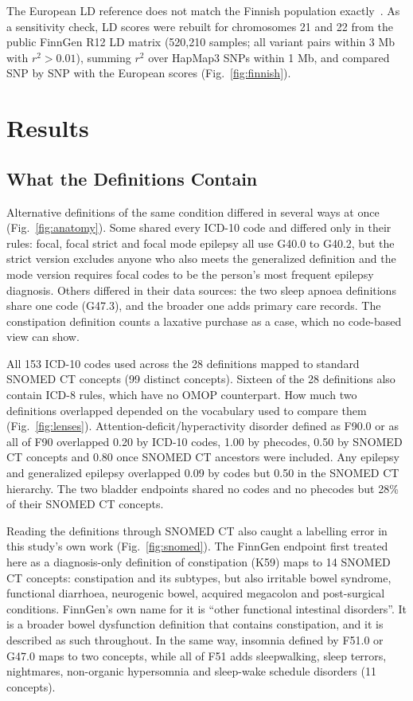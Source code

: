 \documentclass[conference]{IEEEtran}
\begin{document}
The European LD reference does not match the Finnish population exactly~\cite{lim2014}. As a sensitivity check, LD scores were rebuilt for chromosomes 21 and 22 from the public FinnGen R12 LD matrix (520,210 samples; all variant pairs within 3 Mb with $r^2 > 0.01$), summing $r^2$ over HapMap3 SNPs within 1 Mb, and compared SNP by SNP with the European scores (Fig.~\ref{fig:finnish}).

\section{Results}

\subsection{What the Definitions Contain}


Alternative definitions of the same condition differed in several ways at once (Fig.~\ref{fig:anatomy}). Some shared every ICD-10 code and differed only in their rules: focal, focal strict and focal mode epilepsy all use G40.0 to G40.2, but the strict version excludes anyone who also meets the generalized definition and the mode version requires focal codes to be the person's most frequent epilepsy diagnosis. Others differed in their data sources: the two sleep apnoea definitions share one code (G47.3), and the broader one adds primary care records. The constipation definition counts a laxative purchase as a case, which no code-based view can show.

All 153 ICD-10 codes used across the 28 definitions mapped to standard SNOMED CT concepts (99 distinct concepts). Sixteen of the 28 definitions also contain ICD-8 rules, which have no OMOP counterpart. How much two definitions overlapped depended on the vocabulary used to compare them (Fig.~\ref{fig:lenses}). Attention-deficit/hyperactivity disorder defined as F90.0 or as all of F90 overlapped 0.20 by ICD-10 codes, 1.00 by phecodes, 0.50 by SNOMED CT concepts and 0.80 once SNOMED CT ancestors were included. Any epilepsy and generalized epilepsy overlapped 0.09 by codes but 0.50 in the SNOMED CT hierarchy. The two bladder endpoints shared no codes and no phecodes but 28\% of their SNOMED CT concepts.



Reading the definitions through SNOMED CT also caught a labelling error in this study's own work (Fig.~\ref{fig:snomed}). The FinnGen endpoint first treated here as a diagnosis-only definition of constipation (K59) maps to 14 SNOMED CT concepts: constipation and its subtypes, but also irritable bowel syndrome, functional diarrhoea, neurogenic bowel, acquired megacolon and post-surgical conditions. FinnGen's own name for it is ``other functional intestinal disorders''. It is a broader bowel dysfunction definition that contains constipation, and it is described as such throughout. In the same way, insomnia defined by F51.0 or G47.0 maps to two concepts, while all of F51 adds sleepwalking, sleep terrors, nightmares, non-organic hypersomnia and sleep-wake schedule disorders (11 concepts).
\end{document}

